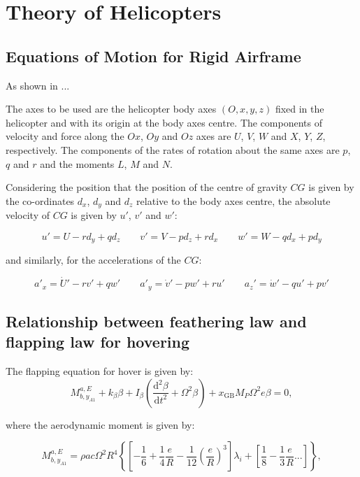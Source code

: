 \section{Theory of Helicopters}

\subsection{Equations of Motion for Rigid Airframe}

  As shown in \cite{Cooke}...

  The axes to be used are the helicopter body axes $(O,x,y,z)$ fixed in the helicopter and with its origin at the body axes centre. The components of velocity and force along the $Ox$, $Oy$ and $Oz$ axes are $U$, $V$, $W$ and $X$, $Y$, $Z$, respectively. The components of the rates of rotation about the same axes are $p$, $q$ and $r$ and the moments $L$, $M$ and $N$.

  Considering the position that the position of the centre of gravity $CG$ is given by the co-ordinates $d_x$, $d_y$ and $d_z$ relative to the body axes centre, the absolute velocity of $CG$ is given by $u'$, $v'$ and $w'$:

  \begin{equation}
  	u' = U - r d_y + q d_z \qquad v' = V - p d_z + r d_x \qquad w' = W - q d_x + p d_y
  \end{equation}

  \noindent
  and similarly, for the accelerations of the $CG$:

  \begin{equation}
  	a'_x = \dot{U}' - r v' + q w' \qquad a'_y = \dot{v}' - p w' + r u' \qquad a_z' = \dot{w}' - q u' + p v'
  \end{equation}

\subsection{Relationship between feathering law and flapping law for hovering}

  The flapping equation for hover is given by:$$M_{b,y_{A1}}^{a,E} + k_\beta \beta + I_\beta \left( \frac{\mathrm{d}^2\beta}{\mathrm{d}t^2} + \Omega^2\beta \right) + x_{\mathrm{GB}}M_P\Omega^2e\beta = 0, $$

  \noindent
  where the aerodynamic moment is given by:

  \begin{equation}
    M_{b,y_{A1}}^{a,E} = \rho a c \Omega^2 R^4 \left\{ \left[ -\frac{1}{6} + \frac{1}{4} \frac{e}{R} - \frac{1}{12} \left( \frac{e}{R} \right)^3 \right] \lambda_i +  \left[ \frac{1}{8} - \frac{1}{3}\frac{e}{R} ... \right] \right\},
  \end{equation}

